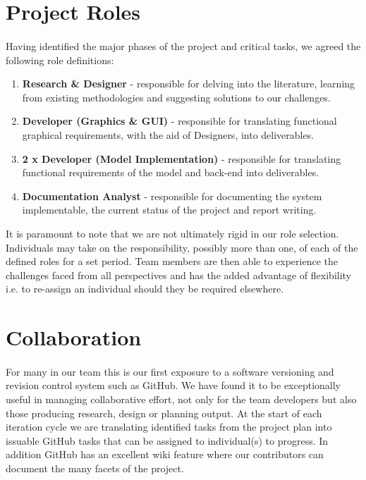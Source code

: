 \documentclass[11pt,a4paper]{article}
\begin{document}
\section{Project Roles}
\paragraph{}
Having identified the major phases of the project and critical tasks, we agreed the following role definitions:

\begin{enumerate}
  \item \textbf{Research \& Designer} - responsible for delving into the literature, learning from existing methodologies and suggesting solutions to our challenges.
  \item \textbf{Developer (Graphics \& GUI)} - responsible for translating functional graphical requirements, with the aid of Designers, into deliverables.
  \item \textbf{2 x Developer (Model Implementation)} - responsible for translating functional requirements of the model and back-end into deliverables.
  \item \textbf{Documentation Analyst} - responsible for documenting the system implementable, the current status of the project and report writing.
\end{enumerate}

It is paramount to note that we are not ultimately rigid in our role selection.  Individuals may take on the responsibility, possibly more than one, of each of the defined roles for a set period.  Team members are then able to experience the challenges faced from all perspectives and has the added advantage of flexibility i.e. to re-assign an individual should they be required elsewhere.

\section{Collaboration}
\paragraph{}
For many in our team this is our first exposure to a software versioning and revision control system such as GitHub.  We have found it to be exceptionally useful in managing collaborative effort, not only for the team developers but also those producing research, design or planning output.  At the start of each iteration cycle we are translating identified tasks from the project plan into issuable GitHub tasks that can be assigned to individual(s) to progress.  In addition GitHub has an excellent wiki feature where our contributors can document the many facets of the project.
\end{document}
